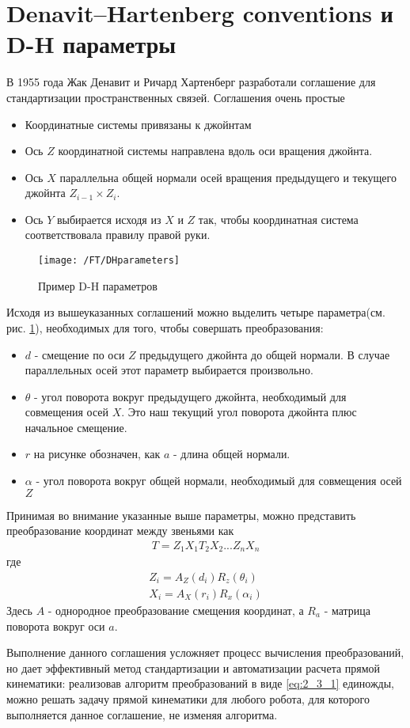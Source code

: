 \section{Denavit–Hartenberg conventions и D-H параметры}\label{sect2_3}
В 1955 года Жак Денавит и Ричард Хартенберг разработали соглашение для стандартизации пространственных связей\cite{DenavitHartenberg}. Соглашения очень простые
\begin{itemize}
	\item Координатные системы привязаны к джойнтам
	\item Ось $Z$ координатной системы направлена вдоль оси вращения джойнта.
	\item Ось $X$ параллельна общей нормали осей вращения предыдущего и текущего джойнта $Z_{i-1} \times Z_{i}$.
	\item Ось $Y$ выбирается исходя из $X$ и $Z$ так, чтобы координатная система соответствовала правилу правой руки.
\end{itemize}
\begin{figure}[h!]
	\centering
	\texttt{[image: /FT/DHparameters]}
	\caption{Пример D-H параметров}
	\label{fig:2_3_1}
\end{figure}
Исходя из вышеуказанных соглашений можно выделить четыре параметра(см. рис. \ref{fig:2_3_1}), необходимых для того, чтобы совершать преобразования:
\begin{itemize}
	\item $d$ - смещение по оси $Z$ предыдущего джойнта до общей нормали. В случае параллельных осей этот параметр выбирается произвольно.
	\item $\theta$ - угол поворота вокруг предыдущего джойнта, необходимый для совмещения осей $X$. Это наш текущий угол поворота джойнта плюс начальное смещение.
	\item $r$ на рисунке обозначен, как $a$ - длина общей нормали.
	\item $\alpha$ - угол поворота вокруг общей нормали, необходимый для совмещения осей $Z$
\end{itemize}
Принимая во внимание указанные выше параметры, можно представить преобразование координат между звеньями как
\begin{align*}
	T = Z_{1}X_{1}T_{2}X_{2} ... Z_{n}X_{n}
\end{align*}
где
\begin{equation}\label{eq:2_3_1}
	\begin{aligned}
		Z_{i} = A_{Z}(d_{i})R_{z}(\theta_{i})\\
		X_{i} = A_{X}(r_{i})R_{x}(\alpha_{i})
	\end{aligned}
\end{equation}
Здесь $A$ - однородное преобразование смещения координат, а $R_{a}$ - матрица поворота вокруг оси $a$.

Выполнение данного соглашения усложняет процесс вычисления преобразований, но дает эффективный метод стандартизации и автоматизации расчета прямой кинематики: реализовав алгоритм преобразований в виде \ref{eq:2_3_1} единожды, можно решать задачу прямой кинематики для любого робота, для которого выполняется данное соглашение, не изменяя алгоритма.
